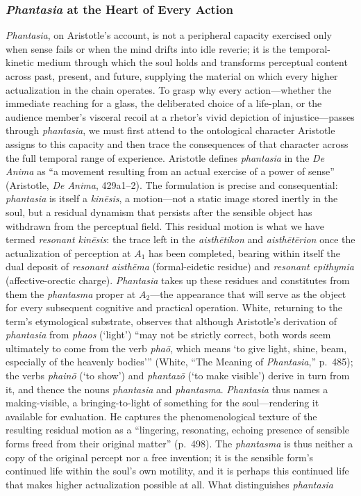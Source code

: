 
\subsubsection*{\textit{Phantasia} at the Heart of Every Action}

\textit{Phantasia}, on Aristotle's account, is not a peripheral capacity exercised only when sense fails or when the mind drifts into idle reverie; it is the temporal-kinetic medium through which the soul holds and transforms perceptual content across past, present, and future, supplying the material on which every higher actualization in the chain operates. To grasp why every action---whether the immediate reaching for a glass, the deliberated choice of a life-plan, or the audience member's visceral recoil at a rhetor's vivid depiction of injustice---passes through \textit{phantasia}, we must first attend to the ontological character Aristotle assigns to this capacity and then trace the consequences of that character across the full temporal range of experience. Aristotle defines \textit{phantasia} in the \textit{De Anima} as ``a movement resulting from an actual exercise of a power of sense'' (Aristotle, \textit{De Anima}, 429a1--2). The formulation is precise and consequential: \textit{phantasia} is itself a \textit{kin\={e}sis}, a motion---not a static image stored inertly in the soul, but a residual dynamism that persists after the sensible object has withdrawn from the perceptual field. This residual motion is what we have termed \textit{resonant kin\={e}sis}: the trace left in the \textit{aisth\={e}tikon} and \textit{aisth\={e}t\={e}rion} once the actualization of perception at $A_1$ has been completed, bearing within itself the dual deposit of \textit{resonant aisth\={e}ma} (formal-eidetic residue) and \textit{resonant epithymia} (affective-orectic charge). \textit{Phantasia} takes up these residues and constitutes from them the \textit{phantasma} proper at $A_2$---the appearance that will serve as the object for every subsequent cognitive and practical operation. White, returning to the term's etymological substrate, observes that although Aristotle's derivation of \textit{phantasia} from \textit{phaos} (`light') ``may not be strictly correct, both words seem ultimately to come from the verb \textit{phaō}, which means `to give light, shine, beam, especially of the heavenly bodies''' (White, ``The Meaning of \textit{Phantasia},'' p.~485); the verbs \textit{phainō} (`to show') and \textit{phantazō} (`to make visible') derive in turn from it, and thence the nouns \textit{phantasia} and \textit{phantasma}. \textit{Phantasia} thus names a making-visible, a bringing-to-light of something for the soul---rendering it available for evaluation. He captures the phenomenological texture of the resulting residual motion as a ``lingering, resonating, echoing presence of sensible forms freed from their original matter'' (p.~498). The \textit{phantasma} is thus neither a copy of the original percept nor a free invention; it is the sensible form's continued life within the soul's own motility, and it is perhaps this continued life that makes higher actualization possible at all. What distinguishes \textit{phantasia} 